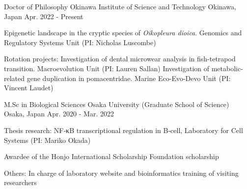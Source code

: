 

\begin{cventries}

  \cventry
    {Doctor of Philosophy} %
    {Okinawa Institute of Science and Technology} %
    {Okinawa, Japan} %
    {Apr. 2022 - Present} %
    {
      \begin{cvitems} %
        \item {Epigenetic landscape in the cryptic species of \textit{Oikopleura dioica}. Genomics and Regulatory Systems Unit (PI: Nicholas Luscombe)}
        \item {Rotation projects:\newline
        Investigation of dental microwear analysis in fish-tetrapod transition. Macroevolution Unit (PI: Lauren Sallan) \newline
        Investigation of metabolic-related gene duplication in pomacentridae. Marine Eco-Evo-Devo Unit (PI: Vincent Laudet)
        }
      \end{cvitems}
    }

\end{cventries}


\begin{cventries}

  \cventry
    {M.Sc in Biological Sciences} %
    {Osaka University (Graduate School of Science)} %
    {Osaka, Japan} %
    {Apr. 2020 - Mar. 2022} %
    {
      \begin{cvitems} %
        \item {Thesis research: NF‑κB transcriptional regulation in B‑cell, Laboratory for Cell Systems (PI: Mariko Okada)}
        \item {Awardee of the Honjo International Scholarship Foundation scholarship}
        \item {Others: In charge of laboratory website and bioinformatics training of visiting researchers}
      \end{cvitems}
    }

\end{cventries}



